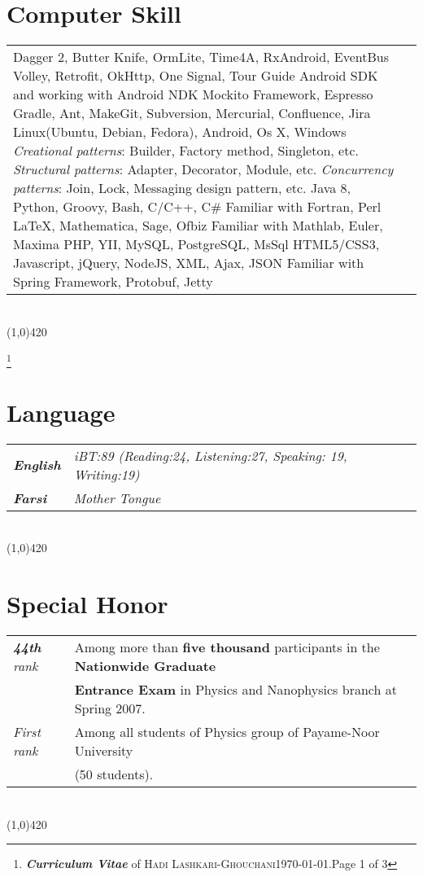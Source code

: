 \documentclass[10pt]{article}
\newcommand{\maxpages}{3}
\newcommand{\maxpages}{3}
\newcommand\HRule{\hspace*{.8cm}\line(1,0){420}\\}
\newenvironment{Record}[1]
{
    \vspace{-0.35cm}
    \section*{#1}
        \vspace{0.1cm}
        \begin{tabular}
}
{
        \end{tabular}\\
        \HRule
}
\newcommand{\FootNote}[1]{\let\thefootnote\relax\footnote{\textbf{\textit{Curriculum Vitae}} of \textsc{Hadi Lashkari-Ghouchani}\qquad\today.\qquad Page #1 of \maxpages}}
\begin{document}
\begin{Record}{Computer Skill}{l l}
    \ComputerSkill{Android Library}
        {Dagger 2, Butter Knife, OrmLite, Time4A, RxAndroid, EventBus}
        {Volley, Retrofit, OkHttp, One Signal, Tour Guide}
        {Android SDK and working with Android NDK}{}{}%
    \ComputerSkill{Android Test Library}
        {Mockito Framework, Espresso}{}{}{}{}%
    \ComputerSkill{Tool}
        {Gradle, Ant, Make}{Git, Subversion, Mercurial, Confluence, Jira}{}{}{}%
    \ComputerSkill{Operating System}
        {Linux(Ubuntu, Debian, Fedora), Android, Os X, Windows}{}{}{}{}%
    \ComputerSkill{Software Design Pattern}
        {\textit{Creational patterns}: Builder, Factory method, Singleton, etc.}
        {\textit{Structural patterns}: Adapter, Decorator, Module, etc.}
        {\textit{Concurrency patterns}: Join, Lock, Messaging design pattern, etc.}{}{}%
    \ComputerSkill{Language}
        {Java 8, Python, Groovy, Bash, C/C++, C\#}
        {Familiar with Fortran, Perl}{}{}{}%
    \ComputerSkill{Special Software}
        {\LaTeX, Mathematica, Sage, Ofbiz}
        {Familiar with Mathlab, Euler, Maxima}{}{}{}%
    \ComputerSkill{Back-End Development}
        {PHP, YII, MySQL, PostgreSQL, MsSql}
        {HTML5/CSS3, Javascript, jQuery, NodeJS, XML, Ajax, JSON}
        {Familiar with Spring Framework, Protobuf, Jetty}{}{}%
\end{Record}


\FootNote{1}


\newcommand{\Language}[2]{
    \textbf{\textsl{#1}}&\textit{#2}\\
}
\begin{Record}{Language}{l l}
    \Language{English}
        {iBT:89 (Reading:24, Listening:27, Speaking: 19, Writing:19)}%
    \Language{Farsi}{Mother Tongue}%
\end{Record}

\newcommand{\SpecialHonor}[3]{
    \textsl{ #1}&#2\\
    &#3\\
}
\begin{Record}{Special Honor}{l l}
    \SpecialHonor{\textbf{44th} rank}
        {Among more than \textbf{five thousand} participants in the \textbf{Nationwide Graduate}}
        {\textbf{Entrance Exam} in Physics and Nanophysics branch at Spring 2007.}%
    \SpecialHonor{First rank}
        {Among all students of Physics group of Payame-Noor University}
        {(50 students).}%
\end{Record}
\end{document}
